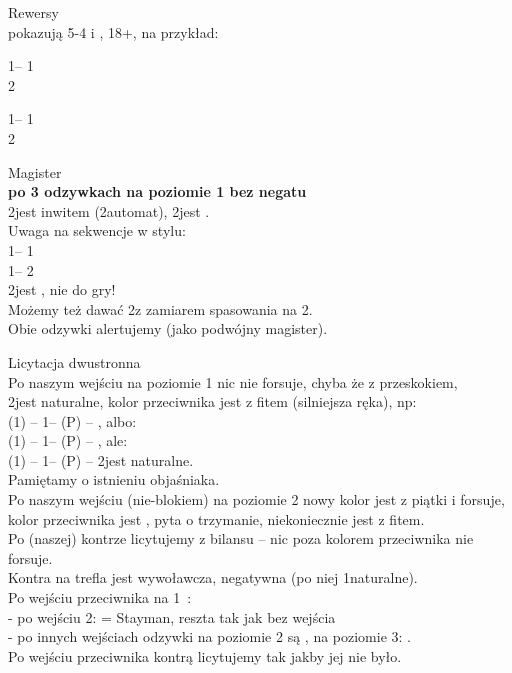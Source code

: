 \documentclass[12pt, a4paper]{article}
\begin{document}
\newpage

Rewersy\\
pokazują 5-4 i \gf, 18+, na przykład:

1\hearts -- 1\nt\\
2\spades

1\clubs -- 1\hearts\\
2\diams

\vspace{0.3cm}

Magister\\
\textbf{po 3 odzywkach na poziomie 1 bez negatu}\\ 2\clubs jest inwitem (2\diams automat),
2\diams jest \gf.\\
Uwaga na sekwencje w stylu:\\
1\diams -- 1\hearts\\
1\spades -- 2\diams\\
2\diams jest \gf, nie do gry!\\
Możemy też dawać 2\clubs z zamiarem spasowania na 2\diams.\\
Obie odzywki {\color{red}alertujemy} (jako podwójny magister).

\vspace{0.3cm}

Licytacja dwustronna\\
Po naszym wejściu na poziomie 1 nic nie forsuje, chyba że z przeskokiem,\\
2\clubs jest naturalne, kolor przeciwnika jest z fitem (silniejsza ręka), np:\\
(1\diams) -- 1\hearts -- (P) -- \alrts{2\diams}, albo:\\
(1\clubs) -- 1\hearts -- (P) -- \alrts{2\clubs}, ale:\\
(1\diams) -- 1\hearts -- (P) -- 2\clubs jest naturalne.\\
Pamiętamy o istnieniu objaśniaka.\\
Po naszym wejściu (nie-blokiem) na poziomie 2 nowy kolor jest z piątki i forsuje,
kolor przeciwnika jest \invp, pyta o trzymanie, niekoniecznie jest z fitem.\\
Po (naszej) kontrze licytujemy z bilansu -- nic poza kolorem przeciwnika nie forsuje.\\
Kontra na trefla jest wywoławcza, negatywna (po niej 1\diams naturalne).\\
Po wejściu przeciwnika na 1\ntx\ :\\
- po wejściu 2\clubs : \dbl = Stayman, reszta tak jak bez wejścia\\
- po innych wejściach odzywki na poziomie 2 są \nf, na poziomie 3: \gf.\\
Po wejściu przeciwnika kontrą licytujemy tak jakby jej nie było.\\
\end{document}

